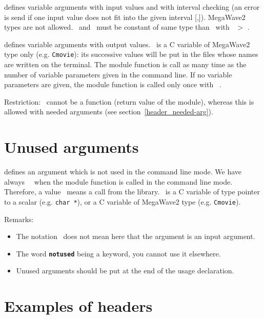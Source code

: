\Liste{\ldots \Rarrow \Cid\  [\Min,\Max]}
defines variable arguments with input values and with interval checking 
(an error is send if one input value does not fit into the given interval [\Min,\Max]).
MegaWave2 types are not allowed.
\Min\ and \Max\ must be constant of same type than \Cid\ with \Max\ $>$ \Min.

\Liste{\ldots \Larrow \Cid} 
defines variable arguments with output values.
\Cid\ is a C variable of MegaWave2 type only (e.g. \verb+Cmovie+): its successive values will be put in the files whose names are written on the terminal.
The module function is call as many time as the number of variable parameters given in the command line.
If no variable parameters are given, the module function is called only once
with  \Cid\ \ENULL.

Restriction: \Cid\ cannot be a function (return value of the module), 
whereas this is allowed with needed arguments (see section~\ref{header_needed-arg}).

\section{Unused arguments}
\label{header_unused-arg}

defines an argument which is not used in the command line mode.
We have always \Cid\ \ENULL\ when the module function is called
in the command line mode.
Therefore, a value \DNULL\ means a call from the library.
\Cid\ is a C variable of type pointer to a scalar (e.g. {\tt char *}),
or a C variable of MegaWave2 type (e.g. \verb+Cmovie+).

Remarks: 
\begin{itemize}
\item The notation \Rarrow\ does not mean here that the argument is an input argument.
\item The word {\bf \verb+notused+} being a keyword, you cannot use it elsewhere.
\item Unused arguments should be put at the end of the usage declaration.
\end{itemize}

\section{Examples of headers}
\label{header_examples}

